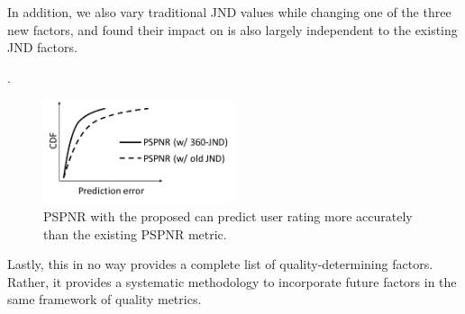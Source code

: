 In addition, we also vary traditional JND values while changing one of the three new factors, and found their impact on \vrjnd is also largely independent to the existing JND factors.


.

\begin{figure}
  \centering
  \includegraphics[width=0.5\textwidth]{figures/pspnr-accuracy.pdf}
  \caption{PSPNR with the proposed \vrjnd can predict user rating more accurately than the  existing PSPNR metric.}
  \label{fig:pspnr-accuracy}
 \end{figure}

Lastly, this in no way provides a complete list of quality-determining factors. 
Rather, it provides a systematic methodology to incorporate future factors in the same framework of \vrvideo quality metrics.








